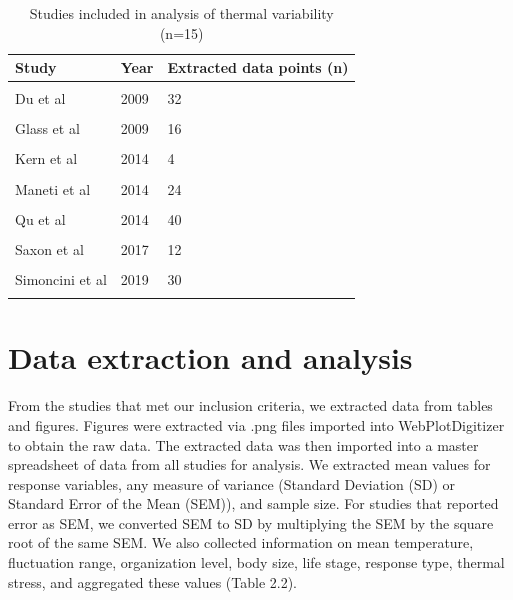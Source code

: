 \documentclass[12pt,twoside]{reedthesis}
\begin{document}
\clearpage
\begin{table}[!h]

\caption[Studies included in analysis of thermal variability]{\label{tab:unnamed-chunk-8}Studies included in analysis of thermal variability (n=15)}
\centering
\begin{tabular}[t]{lll}
\toprule
\textbf{Study} & \textbf{Year} & \textbf{Extracted data points (n)}\\
\midrule
\cellcolor{gray!6}{Delava et al} & \cellcolor{gray!6}{2016} & \cellcolor{gray!6}{16}\\
Du et al & 2009 & 32\\
\cellcolor{gray!6}{Garcia-Ruiz et al} & \cellcolor{gray!6}{2011} & \cellcolor{gray!6}{16}\\
Glass et al & 2009 & 16\\
\cellcolor{gray!6}{Kern et al} & \cellcolor{gray!6}{2015} & \cellcolor{gray!6}{24}\\
\addlinespace
Kern et al & 2014 & 4\\
\cellcolor{gray!6}{Lowenborg et al} & \cellcolor{gray!6}{2012} & \cellcolor{gray!6}{10}\\
Maneti et al & 2014 & 24\\
\cellcolor{gray!6}{Pendlebury et al} & \cellcolor{gray!6}{2004} & \cellcolor{gray!6}{16}\\
Qu et al & 2014 & 40\\
\addlinespace
\cellcolor{gray!6}{Rolandi et al} & \cellcolor{gray!6}{2018} & \cellcolor{gray!6}{4}\\
Saxon et al & 2017 & 12\\
\cellcolor{gray!6}{Semenov et al} & \cellcolor{gray!6}{2007} & \cellcolor{gray!6}{32}\\
Simoncini et al & 2019 & 30\\
\cellcolor{gray!6}{Treidel et al} & \cellcolor{gray!6}{2015} & \cellcolor{gray!6}{4}\\
\bottomrule
\end{tabular}
\end{table}
\hypertarget{data-extraction-and-analysis}{%
\section{Data extraction and analysis}\label{data-extraction-and-analysis}}

From the studies that met our inclusion criteria, we extracted data from tables and figures. Figures were extracted via .png files imported into WebPlotDigitizer to obtain the raw data. The extracted data was then imported into a master spreadsheet of data from all studies for analysis. We extracted mean values for response variables, any measure of variance (Standard Deviation (SD) or Standard Error of the Mean (SEM)), and sample size. For studies that reported error as SEM, we converted SEM to SD by multiplying the SEM by the square root of the same SEM. We also collected information on mean temperature, fluctuation range, organization level, body size, life stage, response type, thermal stress, and aggregated these values (Table 2.2).
\end{document}
